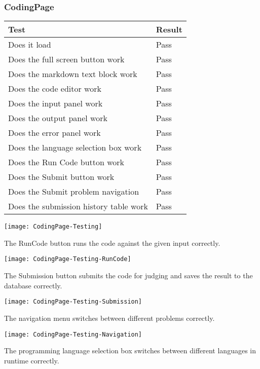 \documentclass[report.tex]{subfiles}
\begin{document}
\subsubsection{CodingPage}

\begin{tabulary}{\linewidth}{|L|l|}
    \hline
    Test & Result \\
    \hline
    Does it load & Pass \\
    \hline
    Does the full screen button work & Pass \\
    \hline
    Does the markdown text block work & Pass \\
    \hline
    Does the code editor work & Pass \\
    \hline
    Does the input panel work & Pass \\
    \hline
    Does the output panel work & Pass \\
    \hline
    Does the error panel work & Pass \\
    \hline
    Does the language selection box work & Pass \\
    \hline
    Does the Run Code button work & Pass \\
    \hline
    Does the Submit button work & Pass \\
    \hline
    Does the Submit problem navigation & Pass \\
    \hline
    Does the submission history table work & Pass \\
    \hline
\end{tabulary}

\texttt{[image: CodingPage-Testing]}

The RunCode button runs the code against the given input correctly. 

\texttt{[image: CodingPage-Testing-RunCode]}

The Submission button submits the code for judging and saves the result to the database correctly.

\texttt{[image: CodingPage-Testing-Submission]}

The navigation menu switches between different problems correctly.

\texttt{[image: CodingPage-Testing-Navigation]}

The programming language selection box switches between different languages in runtime correctly.
\end{document}
